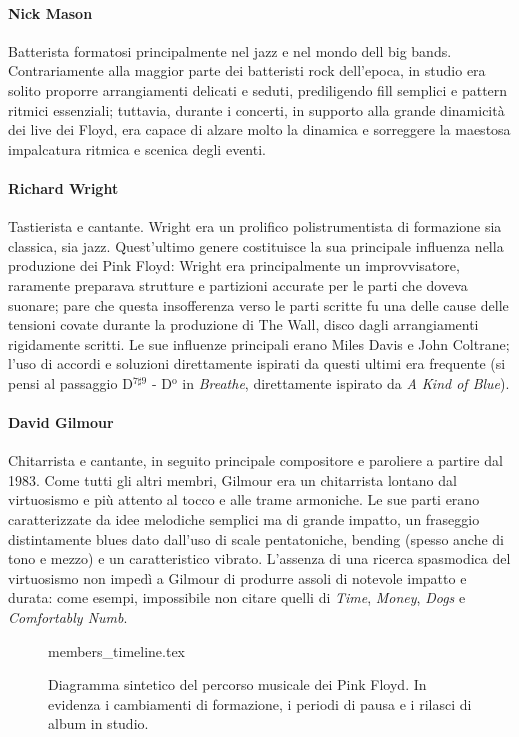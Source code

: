 \documentclass[class=book, crop=false, oneside, 12pt]{standalone}
\begin{document}
    \paragraph{Nick Mason}
    Batterista formatosi principalmente nel jazz e nel mondo dell big bands. Contrariamente alla maggior parte dei batteristi rock dell'epoca, in studio era solito proporre arrangiamenti delicati e seduti, prediligendo fill semplici e pattern ritmici essenziali; tuttavia, durante i concerti, in supporto alla grande dinamicità dei live dei Floyd, era capace di alzare molto la dinamica e sorreggere la maestosa impalcatura ritmica e scenica degli eventi.
    \paragraph{Richard Wright}
    Tastierista e cantante. Wright era un prolifico polistrumentista di formazione sia classica, sia jazz. Quest'ultimo genere costituisce la sua principale influenza nella produzione dei Pink Floyd: Wright era principalmente un improvvisatore, raramente preparava strutture e partizioni accurate per le parti che doveva suonare; pare che questa insofferenza verso le parti scritte fu una delle cause delle tensioni covate durante la produzione di The Wall, disco dagli arrangiamenti rigidamente scritti. Le sue influenze principali erano Miles Davis e John Coltrane; l'uso di accordi e soluzioni direttamente ispirati da questi ultimi era frequente (si pensi al passaggio D\(^{7 \sharp 9}\) - D\(^\textrm{o}\) in \emph{Breathe}, direttamente ispirato da \emph{A Kind of Blue}). 
    \paragraph{David Gilmour}
    Chitarrista e cantante, in seguito principale compositore e paroliere a partire dal 1983. Come tutti gli altri membri, Gilmour era un chitarrista lontano dal virtuosismo e più attento al tocco e alle trame armoniche. Le sue parti erano caratterizzate da idee melodiche semplici ma di grande impatto, un fraseggio distintamente blues dato dall'uso di scale pentatoniche, bending (spesso anche di tono e mezzo) e un caratteristico vibrato. L'assenza di una ricerca spasmodica del virtuosismo non impedì a Gilmour di produrre assoli di notevole impatto e durata: come esempi, impossibile non citare quelli di \emph{Time}, \emph{Money}, \emph{Dogs} e \emph{Comfortably Numb}.

    \begin{figure}[htbp]
        \centering
        {members_timeline.tex}
        \label{fig:01-members-timeline}
        \caption[Diagramma sintetico del percorso musicale dei Pink Floyd.]{Diagramma sintetico del percorso musicale dei Pink Floyd. In evidenza i cambiamenti di formazione, i periodi di pausa e i rilasci di album in studio.}
    \end{figure}
    
\end{document}
